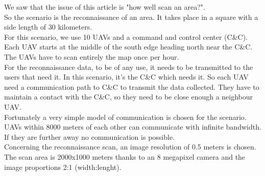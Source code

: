 We saw that the issue of this article is "how well scan an area?".\\
So the scenario is the reconnaissance of an area. It takes place in a square with a side length of 30 kilometers.\\
For this scenario, we use 10 UAVs and a command and control center (C\&C). Each UAV starts at the middle of the south edge heading north near the C\&C.
The UAVs have to scan entirely the map once per hour.\\

For the reconnaissance data, to be of any use, it needs to be transmitted to the users that need it. In this scenario, it's the C\&C which needs it. So each UAV need a communication path to C\&C to transmit the data collected. They have to maintain a contact with the C\&C, so they need to be close enough a neighbour UAV.\\
Fortunately a very simple model of communication is chosen for the scenario.  UAVs  within 8000  meters  of  each  other  can  communicate  with infinite  bandwidth.  If  they  are  further  away  no communication  is  possible.\\

Concerning the reconnaissance scan, an image resolution of 0.5 meters is chosen. The scan area is 2000x1000 meters thanks to an 8 megapixel camera and the image proportions 2:1 (width:lenght).

